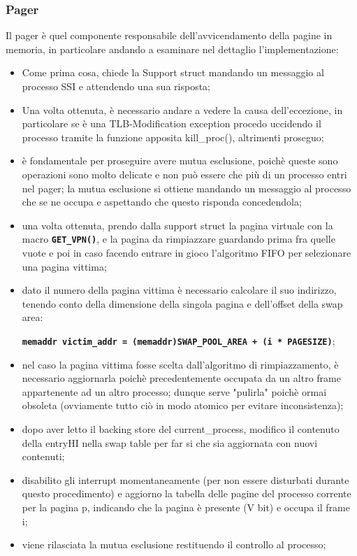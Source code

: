 \documentclass{article}
\begin{document}
	\subsubsection{Pager}
	Il pager è quel componente responsabile dell'avvicendamento della pagine in
	memoria, in particolare andando a esaminare nel dettaglio l'implementazione:
	\begin{itemize}
		\item Come prima cosa, chiede la Support struct mandando un messaggio al
			processo SSI e attendendo una sua risposta;

		\item Una volta ottenuta, è necessario andare a vedere la causa dell'eccezione,
			in particolare se è una TLB-Modification exception procedo uccidendo il processo
			tramite la funzione apposita kill\_proc(), altrimenti proseguo;

		\item è fondamentale per proseguire avere mutua esclusione, poichè queste
			sono operazioni sono molto delicate e non può essere che più di un
			processo entri nel pager; la mutua esclusione si ottiene mandando un messaggio
			al processo che se ne occupa e aspettando che questo risponda concedendola;

		\item una volta ottenuta, prendo dalla support struct la pagina virtuale con
			la macro \texttt{\textbf{GET\_VPN()}}, e la pagina da rimpiazzare
			guardando prima fra quelle vuote e poi in caso facendo entrare in gioco l'algoritmo
			FIFO per selezionare una pagina vittima;

		\item dato il numero della pagina vittima è necessario calcolare il suo indirizzo,
			tenendo conto della dimensione della singola pagina e dell'offset della
			swap area:

			\begin{center}
				\texttt{\textbf{memaddr victim\_addr = (memaddr)SWAP\_POOL\_AREA + (i *
				PAGESIZE)}};
			\end{center}

		\item nel caso la pagina vittima fosse scelta dall'algoritmo di rimpiazzamento,
			è necessario aggiornarla poichè precedentemente occupata da un altro frame
			appartenente ad un altro processo; dunque serve "pulirla" poichè ormai obsoleta
			(ovviamente tutto ciò in modo atomico per evitare inconsistenza);

		\item dopo aver letto il backing store del current\_process, modifico il
			contenuto della entryHI nella swap table per far si che sia aggiornata con
			nuovi contenuti;

		\item disabilito gli interrupt momentaneamente (per non essere disturbati
			durante questo procedimento) e aggiorno la tabella delle pagine del processo
			corrente per la pagina p, indicando che la pagina è presente (V bit) e
			occupa il frame i;

		\item viene rilasciata la mutua esclusione restituendo il controllo al processo;
	\end{itemize}
\end{document}
